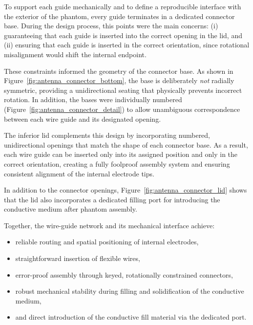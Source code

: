 To support each guide mechanically and to define a reproducible interface with the exterior of the phantom, every guide terminates 
in a dedicated connector base. During the design process, this points were the main concerns: (i) guaranteeing that each guide is inserted
 into the correct opening in the lid, and (ii) ensuring that each guide is inserted in the correct orientation, since rotational misalignment 
 would shift the internal endpoint.

These constraints informed the geometry of the connector base. As shown in Figure~\ref{fig:antenna_connector_bottom}, the base is
 deliberately \emph{not} radially symmetric, providing a unidirectional seating that physically prevents incorrect rotation. 
 In addition, the bases were individually numbered (Figure~\ref{fig:antenna_connector_detail}) to allow unambiguous correspondence 
 between each wire guide and its designated opening.

The inferior lid complements this design by incorporating numbered, unidirectional openings that match the shape of each connector
 base. As a result, each wire guide can be inserted only into its assigned position and only
  in the correct orientation, creating a fully foolproof assembly system and ensuring consistent alignment of the internal electrode tips.

In addition to the connector openings, Figure~\ref{fig:antenna_connector_lid} shows that the lid also incorporates a dedicated
 filling port for introducing the conductive medium after phantom assembly.

Together, the wire-guide network and its mechanical interface achieve:
\begin{itemize}
    \item reliable routing and spatial positioning of internal electrodes,
    \item straightforward insertion of flexible wires,
    \item error-proof assembly through keyed, rotationally constrained connectors,
    \item robust mechanical stability during filling and solidification of the conductive medium,
    \item and direct introduction of the conductive fill material via the dedicated port.
\end{itemize}
